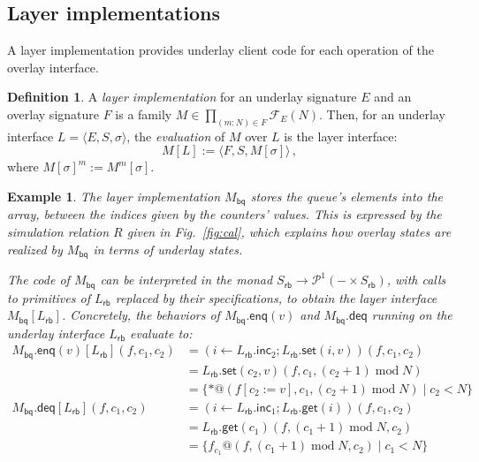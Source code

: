 \documentclass[draft,11pt]{report}
\newtheorem{example}[theorem]{Example}
\theoremstyle{definition}
\newtheorem{definition}[theorem]{Definition}
\newcommand{\kw}[1]{\ensuremath{ \mathsf{#1} }}
\begin{document}

\subsection{Layer implementations} %

A layer implementation provides underlay client code
for each operation of the overlay interface.

\begin{definition}
A \emph{layer implementation}
for an underlay signature $E$ and
an overlay signature $F$
is a family $M \in \prod_{(m:N) \in F} \mathcal{F}_E(N)$.
Then,
for an underlay interface $L = \langle E, S, \sigma \rangle$,
the \emph{evaluation} of $M$ over $L$ is
the layer interface:
\[
  M[L] := \langle F, S, M[\sigma] \rangle \,,
\]
where $M[\sigma]^m := M^m[\sigma]$.
\end{definition}

\begin{example} \label{ex:bqimpl} %
The layer implementation $M_\kw{bq}$ 
stores the queue's elements into the array,
between the indices given by the counters' values.
This is expressed by the simulation relation $R$
given in Fig.~\ref{fig:cal},
which explains how overlay states are realized by $M_\kw{bq}$ 
in terms of underlay states.

The code of $M_\kw{bq}$ can be interpreted in the monad
$
    S_\kw{rb} \rightarrow \mathcal{P}^1(- \times S_\kw{rb})
$,
with calls to primitives of $L_\kw{rb}$
replaced by their specifications,
to obtain the layer interface $M_\kw{bq}[L_\kw{rb}]$.
Concretely,
the behaviors of $M_\kw{bq}.\kw{enq}(v)$ and $M_\kw{bq}.\kw{deq}$
running on the underlay interface $L_\kw{rb}$
evaluate to:
\begin{align*}
  M_\kw{bq}.{\kw{enq}(v)}[L_\kw{rb}](f, c_1, c_2)
    &= (i \leftarrow L_\kw{rb}.\kw{inc}_2 \mathop{;}
        L_\kw{rb}.\kw{set}(i, v))(f, c_1, c_2) \\
    &= L_\kw{rb}.\kw{set}(c_2, v)(f, c_1,
          (c_2 + 1) \mathop{\mathrm{mod}} N) \\
    &= \{ *@(f[c_2 := v], c_1, (c_2 + 1) \mathop{\mathrm{mod}} N) \mid
          c_2 < N \}
  \\[1em]
  M_\kw{bq}.\kw{deq}[L_\kw{rb}](f, c_1, c_2)
    &= (i \leftarrow L_\kw{rb}.\kw{inc}_1 \mathop{;}
        L_\kw{rb}.\kw{get}(i))(f, c_1, c_2) \\
    &= L_\kw{rb}.\kw{get}(c_1)(f,
          (c_1 + 1) \mathop{\mathrm{mod}} N,
          c_2) \\
    &= \{ f_{c_1}@(f, 
          (c_1 + 1) \mathop{\mathrm{mod}} N,
          c_2) \mid
          c_1 < N \}
\end{align*}
\end{example}
\end{document}
